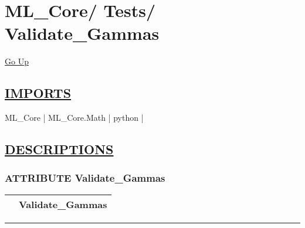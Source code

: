 \chapter*{\color{headfile}
{\large ML\_Core\slash\hspace{0pt}}
{\large Tests\slash\hspace{0pt}}
 \\
Validate_Gammas
}
\hypertarget{ecldoc:toc:ML_Core.Tests.Validate_Gammas}{}
\hyperlink{ecldoc:toc:root/ML_Core/Tests}{Go Up}

\section*{\underline{\textsf{IMPORTS}}}
\begin{doublespace}
{\large
ML\_Core |
ML\_Core.Math |
python |
}
\end{doublespace}

\section*{\underline{\textsf{DESCRIPTIONS}}}
\subsection*{\textsf{\colorbox{headtoc}{\color{white} ATTRIBUTE}
Validate\_Gammas}}

\hypertarget{ecldoc:ml_core.tests.validate_gammas}{}

{\renewcommand{\arraystretch}{1.5}
\begin{tabularx}{\textwidth}{|>{\raggedright\arraybackslash}l|X|}
\hline
\hspace{0pt}\mytexttt{\color{red} } & \textbf{Validate\_Gammas} \\
\hline
\end{tabularx}
}

\par


\rule{\linewidth}{0.5pt}
